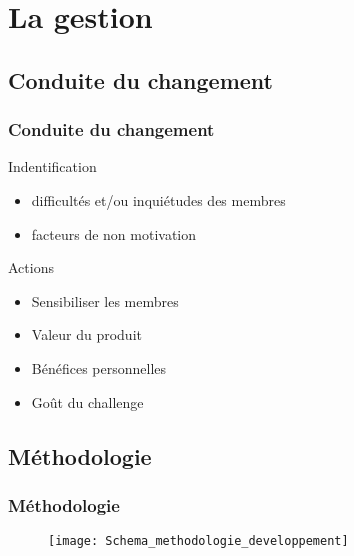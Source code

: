 \section{La gestion}
\subsection{Conduite du changement}
\begin{frame}
  \frametitle{\color{white} Conduite du changement}
  \begin{block}{Indentification}
    \begin{itemize}
      \item difficultés et/ou inquiétudes des membres
      \item facteurs de non motivation
    \end{itemize}
  \end{block}
  \begin{block}{Actions}
    \begin{itemize}
      \item Sensibiliser les membres
      \item Valeur du produit
      \item Bénéfices personnelles
      \item Goût du challenge
    \end{itemize}
  \end{block}
\end{frame}
\subsection{Méthodologie}
\begin{frame}
  \frametitle{\color{white} Méthodologie}
  \begin{figure}[p]
    \centering
    \texttt{[image: Schema\_methodologie\_developpement]}
  \end{figure}
\end{frame}
